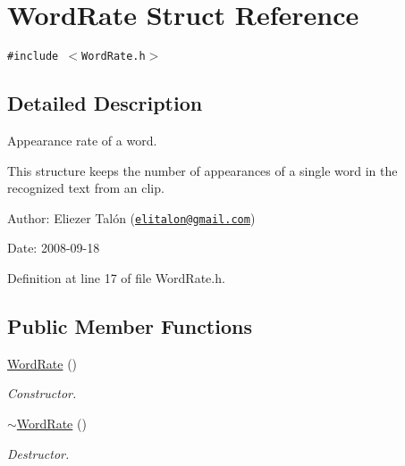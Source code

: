 \hypertarget{struct_word_rate}{
\section{WordRate Struct Reference}
\label{struct_word_rate}
}
{\tt \#include $<$WordRate.h$>$}



\subsection{Detailed Description}
Appearance rate of a word. 

This structure keeps the number of appearances of a single word in the recognized text from an clip.

\begin{Desc}
\item[Author:]Eliezer Talón (\href{mailto:elitalon@gmail.com}{\tt elitalon@gmail.com}) \end{Desc}
\begin{Desc}
\item[Date:]2008-09-18 \end{Desc}


Definition at line 17 of file WordRate.h.\subsection*{Public Member Functions}
\begin{CompactItemize}
\item 
\hyperlink{struct_word_rate_c22aaa0c04769cce44ba08bf5e6eb655}{WordRate} ()
\begin{CompactList}\small\item\em Constructor. \item\end{CompactList}\item 
\hyperlink{struct_word_rate_a86a63516e4c3d4e8aa9060ea5be6b23}{$\sim$WordRate} ()
\begin{CompactList}\small\item\em Destructor. \item\end{CompactList}\end{CompactItemize}
